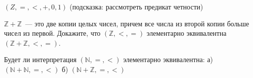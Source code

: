 \begin{ptask}{43}
    $(Z, =, <, +, 0, 1)$ (подсказка: рассмотреть предикат четности)
\end{ptask}

\begin{ptask}{45}
	$\mathbb{Z} + \mathbb{Z}$~--- это две копии целых чисел, причем
    все числа из второй копии больше чисел из первой. Докажите, что
    $(\mathbb{Z}, <, =)$ элементарно эквивалентна $(\mathbb{Z} +
    \mathbb{Z}, <, =)$.
\end{ptask}

\begin{ptask}{46}
    Будет ли интерпретация $(\mathbb{N}, =, <)$ элементарно
    эквивалентна:
    а) $(\mathbb{N} + \mathbb{N}, =, <)$
    б) $(\mathbb{N} + \mathbb{Z}, =, <)$
\end{ptask}